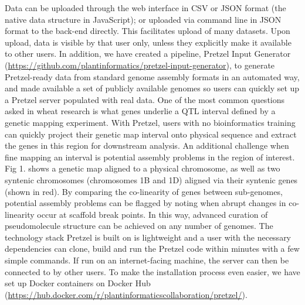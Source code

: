 \documentclass{bioinfo}
\begin{document}
\begin{methods}
Data can be uploaded through the web interface in CSV or JSON format (the native data structure in JavaScript); or uploaded via command line in JSON format to the back-end directly. 
This facilitates upload of many datasets. 
Upon upload, data is visible by that user only, unless they explicitly make it available to other users. 
In addition, we have created a pipeline, Pretzel Input Generator (\href{https://github.com/plantinformatics/pretzel-input-generator}{https://github.com/plantinformatics/pretzel-input-generator}), to generate Pretzel-ready data from standard genome assembly formats in an automated way, and made available a set of publicly available genomes so users can quickly set up a Pretzel server populated with real data.
One of the most common questions asked in wheat research is what genes underlie a QTL interval defined by a genetic mapping experiment. 
With Pretzel, users with no bioinformatics training can quickly project their genetic map interval onto physical sequence and extract the genes in this region for downstream analysis. 
An additional challenge when fine mapping an interval is potential assembly problems in the region of interest. Fig 1. shows a genetic map aligned to a physical chromosome, as well as two syntenic chromosomes (chromosomes 1B and 1D) aligned via their syntenic genes (shown in red). 
By comparing the co-linearity of genes between sub-genomes, potential assembly problems can be flagged by noting when abrupt changes in co-linearity occur at scaffold break points. 
In this way, advanced curation of pseudomolecule structure can be achieved on any number of genomes.
The technology stack Pretzel is built on is lightweight and a user with the necessary dependencies can clone, build and run the Pretzel code within minutes with a few simple commands. 
If run on an internet-facing machine, the server can then be connected to by other users. 
To make the installation process even easier, we have set up Docker containers on Docker Hub (\href{https://hub.docker.com/r/plantinformaticscollaboration/pretzel/}{https://hub.docker.com/r/plantinformaticscollaboration/pretzel/}).



\end{methods}
\end{document}
